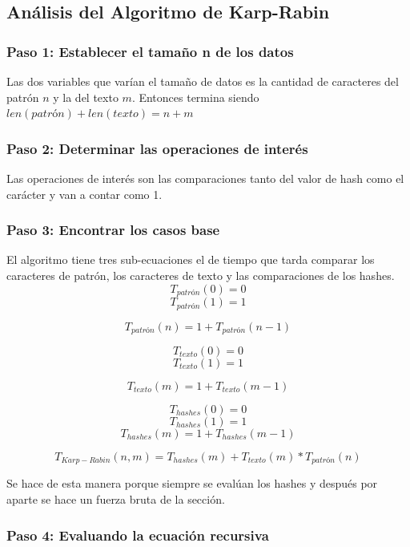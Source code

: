 \subsection*{Análisis del Algoritmo de Karp-Rabin}

\subsubsection*{Paso 1: Establecer el tamaño n de los datos}
Las dos variables que varían el tamaño de datos es la cantidad de caracteres del patrón $n$ y la del texto $m$. Entonces termina siendo $len(patrón) + len(texto) = n + m$

\subsubsection*{Paso 2: Determinar las operaciones de interés}
Las operaciones de interés son las comparaciones tanto del valor de hash como el carácter y van a contar como 1.

\subsubsection*{Paso 3: Encontrar los casos base}
El algoritmo tiene tres sub-ecuaciones el de tiempo que tarda comparar los caracteres de patrón, los caracteres de texto y las comparaciones de los hashes.
\[T_{patrón}(0) =  0\]
\[T_{patrón}(1) = 1\]

\[T_{patrón}(n) = 1 + T_{patrón}(n-1)\]

\[T_{texto}(0) =  0\]
\[T_{texto}(1) = 1\]

\[T_{texto}(m) = 1 + T_{texto}(m-1)\]

\[T_{hashes}(0) = 0\]
\[T_{hashes}(1) = 1\]
\[T_{hashes}(m) = 1 + T_{hashes}(m-1)\]


\[T_{Karp-Rabin}(n,m) = T_{hashes}(m) + T_{texto}(m) * T_{patrón}(n)\]

Se hace de esta manera porque siempre se evalúan los hashes y después por aparte se hace un fuerza bruta de la sección.
\subsubsection*{Paso 4: Evaluando la ecuación recursiva}

